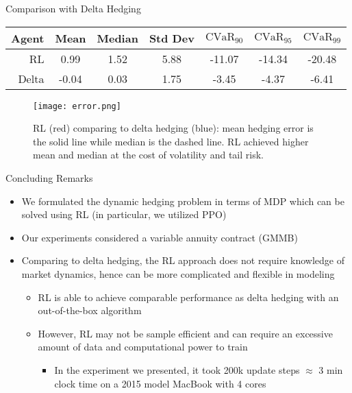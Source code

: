 \documentclass[10pt]{beamer}
\theoremstyle{definition}
\begin{document}
\begin{frame}{Comparison with Delta Hedging}

\begin{center}
\begin{tabular}{@{}rcccccc@{}}
\toprule
Agent & Mean & Median & Std Dev
& $\text{CVaR}_{90}$ & $\text{CVaR}_{95}$ & $\text{CVaR}_{99}$ \\ \midrule
RL    &  0.99 & 1.52 & 5.88 & -11.07 & -14.34 & -20.48 \\
Delta & -0.04 & 0.03 & 1.75 &  -3.45 &  -4.37 &  -6.41 \\
\bottomrule
\end{tabular}
\end{center}

\begin{figure}
\centering
\texttt{[image: error.png]}
\caption{RL (red) comparing to delta hedging (blue): mean hedging error is the solid line while median is the dashed line. RL achieved higher mean and median at the cost of volatility and tail risk.}
\end{figure}

\end{frame}


\begin{frame}{Concluding Remarks}

\begin{itemize}
    \item We formulated the dynamic hedging problem in terms of MDP which can be solved using RL (in particular, we utilized PPO)
    \item Our experiments considered a variable annuity contract (GMMB)
    \item Comparing to delta hedging, the RL approach does not require knowledge of market dynamics, hence can be more complicated and flexible in modeling
    \begin{itemize}
        \item RL is able to achieve comparable performance as delta hedging with an out-of-the-box algorithm
        \item However, RL may not be sample efficient and can require an excessive amount of data and computational power to train
            \begin{itemize}
                \item In the experiment we presented, it took 200k update steps $\approx$ 3 min clock time on a 2015 model MacBook with 4 cores
            \end{itemize}
    \end{itemize}
\end{itemize}

\end{frame}
\end{document}
